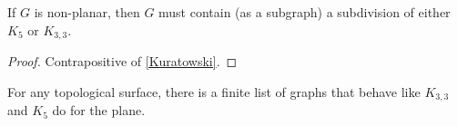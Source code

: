 \begin{thmbox}
    \begin{corollary}
        If $ G $ is non-planar, then $ G $ must contain
        (as a subgraph) a subdivision of either $ K_5 $ or $ K_{3,3} $.
    \end{corollary}
\end{thmbox}
\begin{proof}
    Contrapositive of \ref{Kuratowski}.
\end{proof}

\begin{thmbox}
    \begin{theorem}
        For any topological surface, there is a finite list of graphs that behave
        like $ K_{3,3} $ and $ K_5 $ do for the plane.
    \end{theorem}
\end{thmbox}
